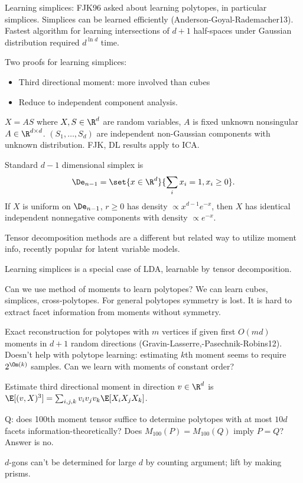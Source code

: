 Learning simplices: 
FJK96 asked about learning polytopes, in particular simplices. Simplices can be learned efficiently (Anderson-Goyal-Rademacher13). Fastest algorithm for learning intersections of $d+1$ half-spaces under Gaussian distribution required $d^{\ln d}$ time. 

Two proofs for learning simplices:
\begin{itemize}
\item
Third directional moment: more involved than cubes
\item
Reduce to independent component analysis.
\end{itemize}

$X=AS$ where $X,S\in \R^d$ are random variables, $A$ is fixed unknown nonsingular $A\in \R^{d\times d}$. 
$(S_1,\ldots, S_d)$ are independent non-Gaussian components with unknown distribution. 
FJK, DL results apply to ICA.

Standard $d-1$ dimensional simplex is 
$$
\De_{n-1} = \set{x\in \R^d}{\sum_i x_i=1, x_i\ge 0}.
$$
If $X$ is uniform on $\De_{n-1}$, $r\ge0$ has density $\propto x^{d-1}e^{-x}$, then $X$ has identical independent nonnegative components with density $\propto e^{-x}$.

Tensor decomposition methods are a different but related way to utilize moment info, recently popular for latent variable models. 

Learning simplices is a special case of LDA, learnable by tensor decomposition. 

Can we use method of moments to learn polytopes? We can learn cubes, simplices, cross-polytopes. For general polytopes symmetry is lost. It is hard to extract facet information from moments without symmetry. 

Exact reconstruction for polytopes with $m$ vertices if given first $O(md)$ moments in $d+1$ random directions (Gravin-Lasserre,-Pasechnik-Robins12). Doesn't help with polytope learning: estimating $k$th moment seems to require $2^{\Om(k)}$ samples.
Can we learn with moments of constant order?

Estimate third directional moment in direction $v\in \R^d$ is $\E[(v,X)^3]=\sum_{i,j,k} v_iv_jv_k \E[X_iX_jX_k]$. 

Q: does 100th moment tensor suffice to determine polytopes with at most $10d$ facets information-theoretically? Does $M_{100}(P) = M_{100}(Q)$ imply $P=Q$? 
Answer is no. 

$d$-gons can't be determined for large $d$ by counting argument; lift by making prisms.

